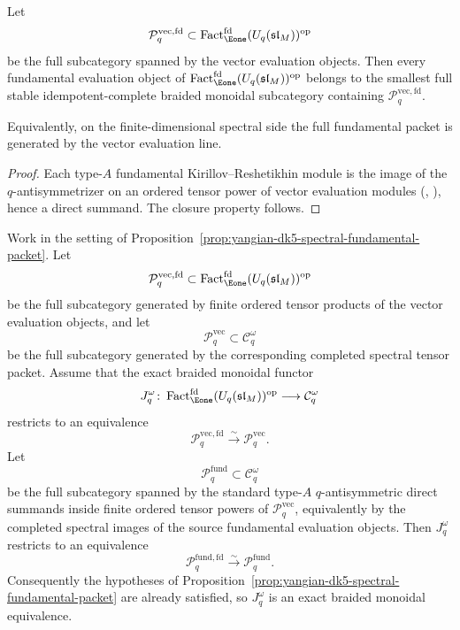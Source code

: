 \begin{lemma}
\label{lem:quantum-fd-vector-fundamental-generation}
Let
\[
\mathcal{P}^{\mathrm{vec,fd}}_{q}
\subset
\operatorname{Fact}_{\Eone}^{\mathrm{fd}}(U_q(\mathfrak{sl}_M))^{\mathrm{op}}
\]
be the full subcategory spanned by the vector evaluation objects.
Then every fundamental evaluation object of
\(\operatorname{Fact}_{\Eone}^{\mathrm{fd}}(U_q(\mathfrak{sl}_M))^{\mathrm{op}}\)
belongs to the smallest full stable idempotent-complete braided
monoidal subcategory containing
\(\mathcal{P}^{\mathrm{vec,fd}}_{q}\).

Equivalently, on the finite-dimensional spectral side the full
fundamental packet is generated by the vector evaluation line.
\end{lemma}

\begin{proof}
Each type-$A$ fundamental Kirillov--Reshetikhin module is the image of
the $q$-antisymmetrizer on an ordered tensor power of vector
evaluation modules (\cite[Ch.~12]{ChariPressley94},
\cite[\S2]{Hernandez05}), hence a direct summand.  The closure
property follows.
\end{proof}

\begin{proposition}
\label{prop:yangian-dk5-spectral-vector-packet}
Work in the setting of
Proposition~\ref{prop:yangian-dk5-spectral-fundamental-packet}.  Let
\[
\mathcal{P}^{\mathrm{vec,fd}}_{q}
\subset
\operatorname{Fact}_{\Eone}^{\mathrm{fd}}(U_q(\mathfrak{sl}_M))^{\mathrm{op}}
\]
be the full subcategory generated by finite ordered tensor products of
the vector evaluation objects, and
let
\[
\mathcal{P}^{\mathrm{vec}}_{q}
\subset
\mathcal{C}_q^\omega
\]
be the full subcategory generated by the corresponding completed
spectral tensor packet.
Assume that the exact braided monoidal functor
\[
J_q^\omega\colon
\operatorname{Fact}_{\Eone}^{\mathrm{fd}}(U_q(\mathfrak{sl}_M))^{\mathrm{op}}
\longrightarrow
\mathcal{C}_q^\omega
\]
restricts to an equivalence
\[
\mathcal{P}^{\mathrm{vec,fd}}_{q}
\xrightarrow{\sim}
\mathcal{P}^{\mathrm{vec}}_{q}.
\]
Let
\[
\mathcal{P}^{\mathrm{fund}}_{q}
\subset
\mathcal{C}_q^\omega
\]
be the full subcategory spanned by the standard type-$A$
$q$-antisymmetric direct summands inside finite ordered tensor powers
of \(\mathcal{P}^{\mathrm{vec}}_{q}\), equivalently by the completed
spectral images of the source fundamental evaluation objects.  Then
\(J_q^\omega\) restricts to an equivalence
\[
\mathcal{P}^{\mathrm{fund,fd}}_{q}
\xrightarrow{\sim}
\mathcal{P}^{\mathrm{fund}}_{q}.
\]
Consequently the hypotheses of
Proposition~\ref{prop:yangian-dk5-spectral-fundamental-packet} are
already satisfied, so \(J_q^\omega\) is an exact braided monoidal
equivalence.

\end{proposition}

